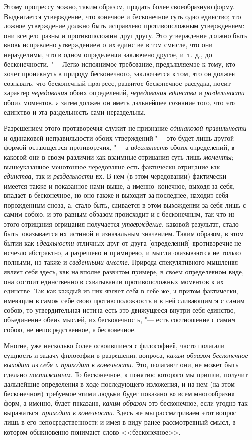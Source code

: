Этому прогрессу можно, таким образом, придать более своеобразную форму.
Выдвигается утверждение, что конечное и бесконечное суть одно единство; это
ложное утверждение должно быть исправлено противоположным утверждением: они
всецело разны и противоположны друг другу. Это утверждение должно быть
вновь исправлено утверждением о их единстве в том смысле, что они
неразделимы, что в одном определении заключено другое, и~т.~д., до
бесконечности. "--- Легко исполнимое требование, предъявляемое к тому, кто
хочет проникнуть в природу бесконечного, заключается в том, что он должен
сознавать, что бесконечный прогресс, развитое бесконечное рассудка, носит
характер {\em чередования} обоих определений,
{\em чередования единства} и
{\em раздельности} обоих моментов, а затем должен он
иметь дальнейшее сознание того, что это единство и эта раздельность сами
нераздельны.

Разрешением этого противоречия служит не признание
{\em одинаковой правильности} и одинаковой
неправильности обоих утверждений "--- это будет лишь другой формой остающегося
противоречия, "--- а {\em идеальность} обоих определений,
в каковой они в своем различии как взаимные отрицания суть лишь
{\em моменты}; вышеуказанное монотонное чередование
есть фактически отрицание как {\em единства}, так и
{\em раздельности} их. В нем (в этом чередовании)
фактически имеется также и показанное нами выше, а именно: конечное, выходя
за себя, впадает в бесконечное, но оно также и выходит за последнее,
находит себя порожденным снова, а, стало быть, сливается в этом выхождении
за себя лишь с самим собою, и это равным образом происходит и с
бесконечным, так что из этого отрицания отрицания получается
{\em утверждение}, каковой результат, стало быть,
оказывается их истиной и изначальным значением. Таким образом, в этом бытии
как {\em идеальности} отличных друг от друга
[определений] противоречие не исчезло абстрактно, а разрешено и примирено,
и мысли оказываются не только полными, но также и
{\em сведенными вместе}. Природа спекулятивного
мышления являет себя здесь, как на вполне развитом примере, в своем
определенном виде; она состоит единственно в схватывании противоположных
моментов в их единстве. Так как каждый из них являет себя в себе же, и
притом фактически, имеющим в самом себе свою противоположность и в ней
сливающимся с самим собою, то утвердительная истина есть это движущееся
внутри себя единство, объединение обеих мыслей, их бесконечность, "--- есть
соотношение с самим собою, не непосредственное, а бесконечное.

Многие, уже несколько более освоившиеся с философией, часто полагали
сущность и задачу философии в разрешении вопроса,
{\em каким образом бесконечное выходит из себя и
приходит к конечности}. Это, полагают они, не может быть сделано
{\em постижимым}. То бесконечное, к понятию которого мы
пришли, получит дальнейшие определения в ходе последующего изложения, и на
нем (на этом бесконечном) требуемое этими людьми будет показано во всем
многообразии форм, а именно, будет показано, {\em каким
образом} это бесконечное, если угодно так выражаться,
{\em приходит к конечности}. Здесь же мы рассматриваем
этот вопрос лишь в его непосредственности и имея в виду ранее рассмотренный
смысл, в котором обыкновенно понимают слово <<бесконечное>>.

